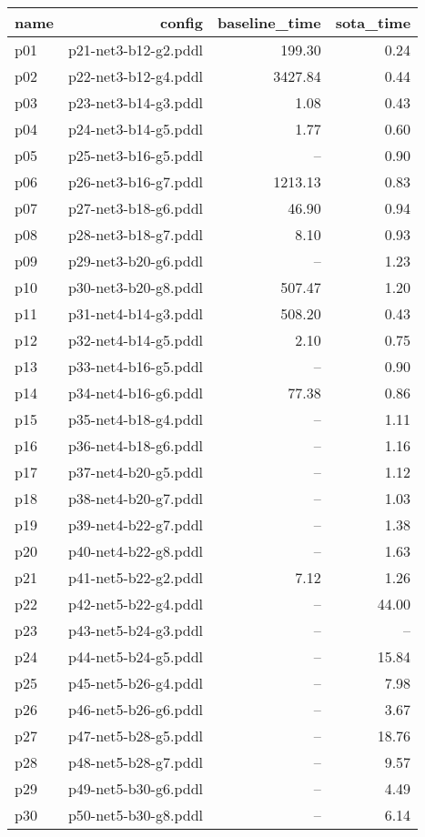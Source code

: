 \documentclass{article}
\begin{document}
                            \begin{center}
                            \scriptsize
                            \begin{tabular}{@{}l|r|r|r@{}}
                            name & config & baseline\_time & sota\_time\\\midrule
                              p01& p21-net3-b12-g2.pddl&199.30&0.24\\
  p02& p22-net3-b12-g4.pddl&3427.84&0.44\\
  p03& p23-net3-b14-g3.pddl&1.08&0.43\\
  p04& p24-net3-b14-g5.pddl&1.77&0.60\\
  p05& p25-net3-b16-g5.pddl&--&0.90\\
  p06& p26-net3-b16-g7.pddl&1213.13&0.83\\
  p07& p27-net3-b18-g6.pddl&46.90&0.94\\
  p08& p28-net3-b18-g7.pddl&8.10&0.93\\
  p09& p29-net3-b20-g6.pddl&--&1.23\\
  p10& p30-net3-b20-g8.pddl&507.47&1.20\\
  p11& p31-net4-b14-g3.pddl&508.20&0.43\\
  p12& p32-net4-b14-g5.pddl&2.10&0.75\\
  p13& p33-net4-b16-g5.pddl&--&0.90\\
  p14& p34-net4-b16-g6.pddl&77.38&0.86\\
  p15& p35-net4-b18-g4.pddl&--&1.11\\
  p16& p36-net4-b18-g6.pddl&--&1.16\\
  p17& p37-net4-b20-g5.pddl&--&1.12\\
  p18& p38-net4-b20-g7.pddl&--&1.03\\
  p19& p39-net4-b22-g7.pddl&--&1.38\\
  p20& p40-net4-b22-g8.pddl&--&1.63\\
  p21& p41-net5-b22-g2.pddl&7.12&1.26\\
  p22& p42-net5-b22-g4.pddl&--&44.00\\
  p23& p43-net5-b24-g3.pddl&--&--\\
  p24& p44-net5-b24-g5.pddl&--&15.84\\
  p25& p45-net5-b26-g4.pddl&--&7.98\\
  p26& p46-net5-b26-g6.pddl&--&3.67\\
  p27& p47-net5-b28-g5.pddl&--&18.76\\
  p28& p48-net5-b28-g7.pddl&--&9.57\\
  p29& p49-net5-b30-g6.pddl&--&4.49\\
  p30& p50-net5-b30-g8.pddl&--&6.14
                            \end{tabular}
                            \end{center}
                    
\end{document}
